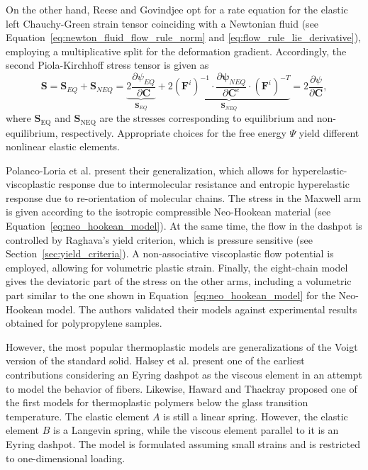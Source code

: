 On the other hand, Reese and Govindjee \citep{reeseTheoryFiniteViscoelasticity1998} opt for a rate equation for the elastic left Chauchy-Green strain tensor coinciding with a Newtonian fluid (see Equation~\eqref{eq:newton_fluid_flow_rule_norm} and \eqref{eq:flow_rule_lie_derivative}), employing a multiplicative split for the deformation gradient.
Accordingly, the second Piola-Kirchhoff stress tensor is given as
\begin{equation}
	\mathbf{S}=\mathbf{S}_{E Q}+\mathbf{S}_{N E Q}=\underbrace{2 \frac{\partial \psi_{E Q}}{\partial \mathbf{C}}}_{\mathbf{S}_{E Q}}+\underbrace{2 (\mathbf{F}^i)^{-1} \cdot \frac{\partial \mathbf{\psi}_{N E Q}}{\partial \mathbf{C}^e} \cdot (\mathbf{F}^i)^{-T}}_{\mathbf{S}_{N E Q}}=2 \frac{\partial \psi}{\partial \mathbf{C}},
\end{equation}
where $\mathbf S_\text{EQ}$ and $\mathbf S_\text{NEQ}$ are the stresses corresponding to equilibrium and non-equilibrium, respectively.
Appropriate choices for the free energy $\Psi$ yield different nonlinear elastic elements.

Polanco-Loria et al. \citep{polanco-loriaConstitutiveModelThermoplastics2010} present their generalization, which allows for hyperelastic-viscoplastic response due to intermolecular resistance and entropic hyperelastic response due to re-orientation of molecular chains.
The stress in the Maxwell arm is given according to the isotropic compressible Neo-Hookean material (see Equation~\eqref{eq:neo_hookean_model}).
At the same time, the flow in the dashpot is controlled by Raghava's yield criterion, which is pressure sensitive (see Section~\ref{sec:yield_criteria}).
A non-associative viscoplastic flow potential is employed, allowing for volumetric plastic strain.
Finally, the eight-chain model gives the deviatoric part of the stress on the other arms, including a volumetric part similar to the one shown in Equation~\eqref{eq:neo_hookean_model} for the Neo-Hookean model.
The authors validated their models against experimental results obtained for polypropylene samples.

However, the most popular thermoplastic models are generalizations of the Voigt version of the standard solid.
Halsey et al. \citep{halseyMechanicalPropertiesTextiles1945} present one of the earliest contributions considering an Eyring dashpot as the viscous element in an attempt to model the behavior of fibers.
Likewise, Haward and Thackray \citep{hawardUseMathematicalModel1968} proposed one of the first models for thermoplastic polymers below the glass transition temperature.
The elastic element $A$ is still a linear spring.
However, the elastic element $B$ is a Langevin spring, while the viscous element parallel to it is an Eyring dashpot.
The model is formulated assuming small strains and is restricted to one-dimensional loading.

